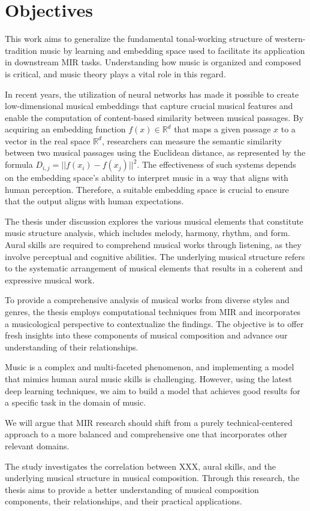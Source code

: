 \section{Objectives}

This work aims to generalize the fundamental tonal-working structure of western-tradition music by learning and embedding space used to facilitate its application in downstream MIR tasks. Understanding how music is organized and composed is critical, and music theory plays a vital role in this regard.

In recent years, the utilization of neural networks has made it possible to create low-dimensional musical embeddings that capture crucial musical features and enable the computation of content-based similarity between musical passages. By acquiring an embedding function $f(x) \in \mathbb{R}^d$ that maps a given passage $x$ to a vector in the real space $\mathbb{R}^d$, researchers can measure the semantic similarity between two musical passages using the Euclidean distance, as represented by the formula $D_{i,j} = ||f(x_i) - f(x_j)||^2$. The effectiveness of such systems depends on the embedding space's ability to interpret music in a way that aligns with human perception. Therefore, a suitable embedding space is crucial to ensure that the output aligns with human expectations.

The thesis under discussion explores the various musical elements that constitute music structure analysis, which includes melody, harmony, rhythm, and form. Aural skills are required to comprehend musical works through listening, as they involve perceptual and cognitive abilities. The underlying musical structure refers to the systematic arrangement of musical elements that results in a coherent and expressive musical work.

To provide a comprehensive analysis of musical works from diverse styles and genres, the thesis employs computational techniques from MIR and incorporates a musicological perspective to contextualize the findings. The objective is to offer fresh insights into these components of musical composition and advance our understanding of their relationships.


Music is a complex and multi-faceted phenomenon, and implementing a model that mimics human aural music skills is challenging. However, using the latest deep learning techniques, we aim to build a model that achieves good results for a specific task in the domain of music.

We will argue that MIR research should shift from a purely technical-centered approach to a more balanced and comprehensive one that incorporates other relevant domains.

The study investigates the correlation between XXX, aural skills, and the underlying musical structure in musical composition. Through this research, the thesis aims to provide a better understanding of musical composition components, their relationships, and their practical applications.